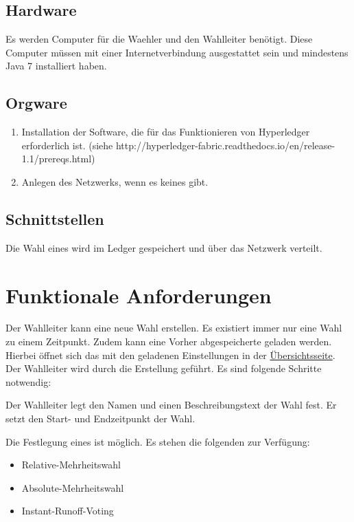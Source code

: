\documentclass[parskip=full,11pt,twoside]{scrartcl}
\begin{document}
\subsection{Hardware}
Es werden Computer für die \gls{Waehler} und den \gls{Wahlleiter} benötigt. Diese Computer müssen mit einer Internetverbindung ausgestattet sein und mindestens Java 7 installiert haben.

\subsection{Orgware}
\begin{enumerate}
\item Installation der Software, die für das Funktionieren von Hyperledger erforderlich ist. (siehe http://hyperledger-fabric.readthedocs.io/en/release-1.1/prereqs.html)
\item Anlegen des Netzwerks, wenn es keines gibt.
\end{enumerate}

\subsection{Schnittstellen}
Die \gls{Wahl} eines  wird im \gls{Ledger} gespeichert und über das \gls{Netzwerk} verteilt.

\section{Funktionale Anforderungen}

Der \gls{Wahlleiter} kann eine neue \gls{Wahl} erstellen. Es existiert immer nur eine \gls{Wahl} zu einem Zeitpunkt.
Zudem kann eine Vorher abgespeicherte  geladen werden. Hierbei öffnet sich das  mit den geladenen Einstellungen in der \hyperref[fig:wlltr-done]{Übersichtsseite}.
Der \gls{Wahlleiter} wird durch die Erstellung geführt. Es sind folgende Schritte notwendig:

Der \gls{Wahlleiter} legt den Namen und einen Beschreibungstext der \gls{Wahl} fest.
Er setzt den Start- und Endzeitpunkt der \gls{Wahl}.

Die Festlegung eines  ist möglich. Es stehen die folgenden zur Verfügung:
\begin{itemize}
	\item \gls{Relative-Mehrheitswahl}
	\item \gls{Absolute-Mehrheitswahl}
	\item \gls{Instant-Runoff-Voting}
\end{itemize}
\end{document}
